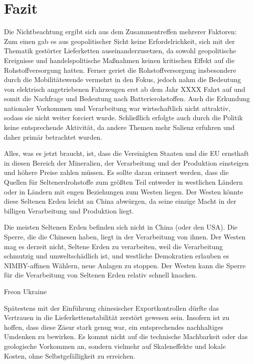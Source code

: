 \documentclass[12pt,a4paper,oneside]{book} %
\begin{document}
	
	\chapter{Fazit}
	
Die Nichtbeachtung ergibt sich aus dem Zusammentreffen mehrerer Faktoren: Zum einen gab es aus geopolitischer Sicht keine Erfordelrichkeit, sich mit der Thematik gestörter Lieferketten auseinanderzusetzen, da sowohl geopolitische Ereignisse und handelspolitische Maßnahmen keinen kritischen Effekt auf die Rohstoffversorgung hatten.
Ferner geriet die Rohstoffversorgung insbesondere durch die Mobilitätswende vermehrt in den Fokus, jedoch nahm die Bedeutung von elektrisch angetriebenen Fahrzeugen erst ab dem Jahr XXXX Fahrt auf und somit die Nachfrage und Bedeutung nach Batterierohstoffen.
Auch die Erkundung nationaler Vorkommen und Verarbeitung war wirtschaftlich nicht attraktiv, sodass sie nicht weiter forciert wurde.
Schließlich erfolgte auch durch die Politik keine entsprechende Aktivität, da andere Themen mehr Salienz erfuhren und daher primär betrachtet wurden.

Alles, was es jetzt braucht, ist, dass die Vereinigten Staaten und die EU ernsthaft in diesen Bereich der Mineralien, der Verarbeitung und der Produktion einsteigen und höhere Preise zahlen müssen. Es sollte daran erinnert werden, dass die Quellen für Seltenerdrohstoffe zum größten Teil entweder in westlichen Ländern oder in Ländern mit engen Beziehungen zum Westen liegen. Der Westen könnte diese Seltenen Erden leicht an China abwürgen, da seine einzige Macht in der billigen Verarbeitung und Produktion liegt.

Die meisten Seltenen Erden befinden sich nicht in China (oder den USA). Die Sperre, die die Chinesen haben, liegt in der Verarbeitung von ihnen. Der Westen mag es derzeit nicht, Seltene Erden zu verarbeiten, weil die Verarbeitung schmutzig und umweltschädlich ist, und westliche Demokratien erlauben es NIMBY-affinen Wählern, neue Anlagen zu stoppen. Der Westen kann die Sperre für die Verarbeitung von Seltenen Erden relativ schnell knacken.

Freon Ukraine

Spätestens mit der Einführung chinesischer Exportkontrollen dürfte das Vertrauen in die Lieferkettenstabilität zerstört gewesen sein. Insofern ist zu hoffen, dass diese Zäsur stark genug war, ein entsprechendes nachhaltiges Umdenken zu bewirken. Es kommt nicht auf die technische Machbarkeit oder das geologische Vorkommen an, sondern vielmehr auf Skaleneffekte und lokale Kosten, ohne Selbstgefälligkeit zu erreichen.
	
	
\end{document}
